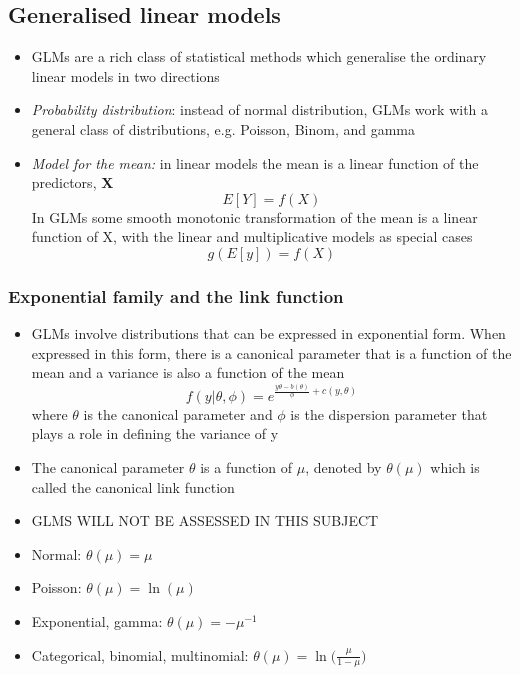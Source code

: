 \documentclass{article}
\begin{document}
\subsection{Generalised linear models}
\begin{itemize}
    \item GLMs are a rich class of statistical methods which generalise the ordinary linear models in two directions
    \item \textit{Probability distribution}: instead of normal distribution, GLMs work with a general class of distributions, e.g. Poisson, Binom, and gamma
    \item \textit{Model for the mean:} in linear models the mean is a linear function of the predictors, \textbf{X}
    \begin{equation*}
        E[Y] = f(X)
    \end{equation*}
    In GLMs some smooth monotonic transformation of the mean is a linear function of X, with the linear and multiplicative models as special cases
    \begin{equation*}
        g(E[y]) = f(X)
    \end{equation*}
\end{itemize}

\subsubsection{Exponential family and the link function}
\begin{itemize}
    \item GLMs involve distributions that can be expressed in exponential form. When expressed in this form, there is a canonical parameter that is a function of the mean and a variance is also a function of the mean
    \begin{equation*}
        f(y|\theta,\phi) = e^{\frac{y \theta - b(\theta)}{\phi} + c(y,\theta)}
    \end{equation*}
    where $\theta$ is the canonical parameter and $\phi$ is the dispersion parameter that plays a role in defining the variance of y
    \item The canonical parameter $\theta$ is a function of $\mu$, denoted by $\theta(\mu)$ which is called the canonical link function
    \item GLMS WILL NOT BE ASSESSED IN THIS SUBJECT
  \item Normal: $\displaystyle \theta(\mu) = \mu$
  \item Poisson: $\displaystyle \theta(\mu) = \ln(\mu)$
  \item Exponential, gamma: $\displaystyle \theta(\mu) = -\mu^{-1}$
  \item Categorical, binomial, multinomial: $\displaystyle \theta(\mu) = \ln\!\biggl(\frac{\mu}{1-\mu}\biggr)$
\end{itemize}
\end{document}
